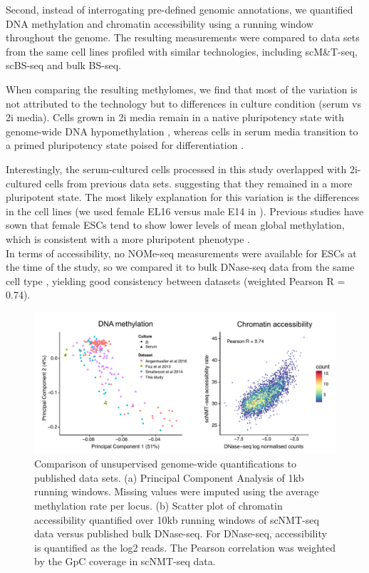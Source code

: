 

Second, instead of interrogating pre-defined genomic annotations, we quantified DNA methylation and chromatin accessibility using a running window throughout the genome. The resulting measurements were compared to data sets from the same cell lines profiled with similar technologies, including scM\&T-seq\cite{Angermueller2016}, scBS-seq\cite{Smallwood2014} and bulk BS-seq\cite{Ficz2013}.

When comparing the resulting methylomes, we find that most of the variation is not attributed to the technology but to differences in culture condition (serum vs 2i media). Cells grown in 2i media remain in a native pluripotency state with genome-wide DNA hypomethylation \cite{Ficz2013}, whereas cells in serum media transition to a primed pluripotency state poised for differentiation \cite{Tosolini2016}.

Interestingly, the serum-cultured cells processed in this study overlapped with 2i-cultured cells from previous data sets. suggesting that they remained in a more pluripotent state. The most likely explanation for this variation is the differences in the cell lines (we used female EL16 versus male E14 in \cite{Angermueller2016,Smallwood2014,Ficz2013}). Previous studies have sown that female ESCs tend to show lower levels of mean global methylation, which is consistent with a more pluripotent phenotype \cite{Zvetkova2005}.\\

In terms of accessibility, no NOMe-seq measurements were available for ESCs at the time of the study, so we compared it to bulk DNase-seq data from the same cell type \cite{XX}, yielding good consistency between datasets (weighted Pearson R = 0.74).
\begin{figure}[H]
	\centering
	\includegraphics[width=1.0\linewidth]{scNMT_comparison}
	\caption[]{Comparison of unsupervised genome-wide quantifications to published data sets. (a) Principal Component Analysis of 1kb running windows. Missing values were imputed using the average methylation rate per locus. (b) Scatter plot of chromatin accessibility quantified over 10kb running windows of scNMT-seq data versus published bulk DNase-seq. For DNase-seq, accessibility is quantified as the log2 reads. The Pearson correlation was weighted by the GpC coverage in scNMT-seq data. }
	\label{fig:scnmt_comparison}
\end{figure}

